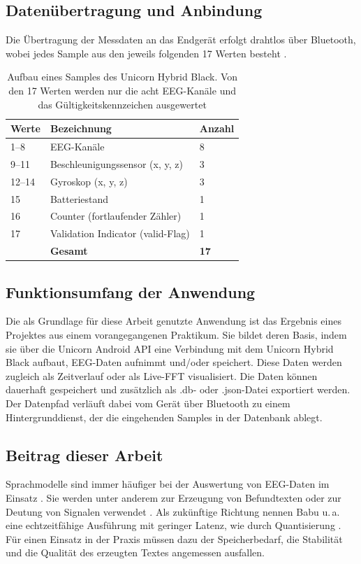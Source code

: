 \subsection{Datenübertragung und Anbindung}
Die Übertragung der Messdaten an das Endgerät erfolgt drahtlos über Bluetooth, wobei jedes Sample aus den jeweils folgenden 17 Werten besteht \autocite{unicornbtprotocol}.

    \begin{table}[H]
\centering
\caption[Aufbau eines Samples]{Aufbau eines Samples des Unicorn Hybrid Black. Von den 17 Werten werden nur die acht EEG-Kanäle und das Gültigkeitskennzeichen ausgewertet \autocite{unicornbtprotocol}}
\label{tab:unicorn-sample}
\begin{tabularx}{\textwidth}{l X l}
\toprule
\textbf{Werte} & \textbf{Bezeichnung} & \textbf{Anzahl} \\
\midrule
1--8   & EEG-Kanäle                          & 8 \\
9--11  & Beschleunigungssensor (x, y, z)     & 3 \\
12--14 & Gyroskop (x, y, z)                  & 3 \\
15     & Batteriestand                       & 1 \\
16     & Counter (fortlaufender Zähler)      & 1 \\
17     & Validation Indicator (valid-Flag)   & 1 \\
\midrule
       & \textbf{Gesamt}                     & \textbf{17} \\
\bottomrule
\end{tabularx}
\end{table}

\subsection{Funktionsumfang der Anwendung}
Die als Grundlage für diese Arbeit genutzte Anwendung ist das Ergebnis eines Projektes aus einem vorangegangenen Praktikum. Sie bildet deren Basis, indem sie über die Unicorn Android API \autocite{unicornapi} eine Verbindung mit dem Unicorn Hybrid Black aufbaut, \ac{EEG}-Daten aufnimmt und/oder speichert. Diese Daten werden zugleich als Zeitverlauf oder als Live-\ac{FFT} visualisiert.
    Die Daten können dauerhaft gespeichert und zusätzlich als .db- oder .json-Datei exportiert werden. Der Datenpfad verläuft dabei vom Gerät über Bluetooth zu einem Hintergrunddienst, der die eingehenden Samples in der Datenbank ablegt.
\subsection{Beitrag dieser Arbeit}
Sprachmodelle sind immer häufiger bei der Auswertung von \ac{EEG}-Daten im Einsatz \autocite{eeg_llm_survey2025}. Sie werden unter anderem zur Erzeugung von Befundtexten oder zur Deutung von Signalen verwendet \autocite{eeg_llm_survey2025}. Als zukünftige Richtung nennen Babu u.\,a. eine echtzeitfähige Ausführung mit geringer Latenz, wie durch Quantisierung \autocite{eeg_llm_survey2025}. Für einen Einsatz in der Praxis müssen dazu der Speicherbedarf, die Stabilität und die Qualität des erzeugten Textes angemessen ausfallen.
\vspace{\baselineskip}

